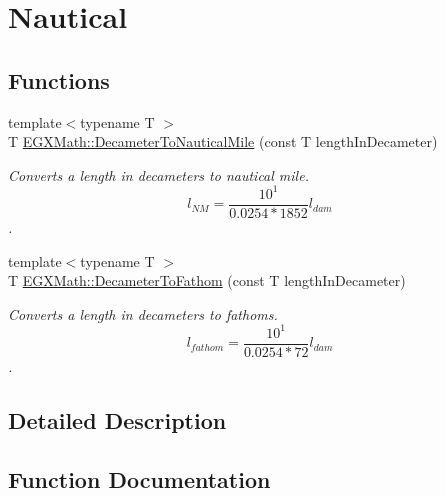 \hypertarget{group___e_g_x_math-_conversions-_length_conversions-_s_i-_decameter-_nautical}{}\section{Nautical}
\label{group___e_g_x_math-_conversions-_length_conversions-_s_i-_decameter-_nautical}
\subsection*{Functions}
\begin{DoxyCompactItemize}
\item 
{\footnotesize template$<$typename T $>$ }\\T \mbox{\hyperlink{group___e_g_x_math-_conversions-_length_conversions-_s_i-_decameter-_nautical_ga099c662953d7c82d538755bd699993b1}{E\+G\+X\+Math\+::\+Decameter\+To\+Nautical\+Mile}} (const T length\+In\+Decameter)
\begin{DoxyCompactList}\small\item\em Converts a length in decameters to nautical mile. \[ l_{NM}= \frac{10^{1}}{0.0254 * 1852} l_{dam} \]. \end{DoxyCompactList}\item 
{\footnotesize template$<$typename T $>$ }\\T \mbox{\hyperlink{group___e_g_x_math-_conversions-_length_conversions-_s_i-_decameter-_nautical_ga26e58af8b0bdc9bfb22635741a498217}{E\+G\+X\+Math\+::\+Decameter\+To\+Fathom}} (const T length\+In\+Decameter)
\begin{DoxyCompactList}\small\item\em Converts a length in decameters to fathoms. \[ l_{fathom}= \frac{10^{1}}{0.0254 * 72} l_{dam} \]. \end{DoxyCompactList}\end{DoxyCompactItemize}


\subsection{Detailed Description}


\subsection{Function Documentation}
\mbox{\label{group___e_g_x_math-_conversions-_length_conversions-_s_i-_decameter-_nautical_ga26e58af8b0bdc9bfb22635741a498217}} 
